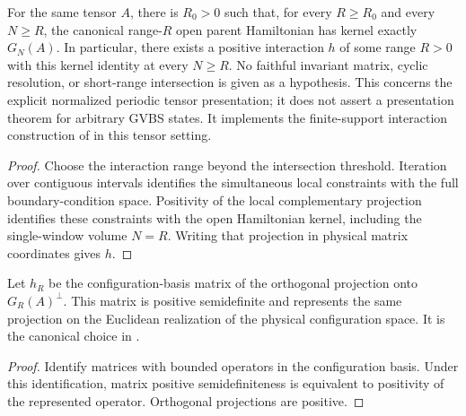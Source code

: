 \begin{lemma}
    \label{thm:periodic_original_parent_interaction}
    \leanok
    For the same tensor $A$, there is $R_0>0$ such that, for every $R\ge R_0$
    and every $N\ge R$, the canonical range-$R$ open parent Hamiltonian has
    kernel exactly $G_N(A)$. In particular, there exists a positive interaction
    $h$ of some range $R>0$ with this kernel identity at every $N\ge R$.
    No faithful invariant matrix, cyclic resolution, or short-range intersection
    is given as a hypothesis.
    This concerns the explicit normalized periodic tensor presentation; it does
    not assert a presentation theorem for arbitrary GVBS states.
    It implements the finite-support interaction construction of
    \cite[Lemma existenceinteraction and Theorem~1.1]{Nachtergaele1996Spectral}
    in this tensor setting.
\end{lemma}
\begin{proof}\leanok
    Choose the interaction range beyond the intersection threshold.
    Iteration over contiguous intervals identifies the simultaneous local
    constraints with the full boundary-condition space. Positivity of the
    local complementary projection identifies these constraints with the open
    Hamiltonian kernel, including the single-window volume $N=R$.
    Writing that projection in physical matrix coordinates gives $h$.
\end{proof}

\begin{definition}
    \label{def:canonical_parent_interaction_matrix}
    \leanok
    Let \(h_R\) be the configuration-basis matrix of the orthogonal
    projection onto \(G_R(A)^\perp\). This matrix is positive semidefinite
    and represents the same projection on the Euclidean realization of
    the physical configuration space. It is the canonical choice in
    \cite[Lemma existenceinteraction]{Nachtergaele1996Spectral}.
\end{definition}
\begin{proof}\leanok
    Identify matrices with bounded operators in the configuration basis.
    Under this identification, matrix positive semidefiniteness is equivalent
    to positivity of the represented operator. Orthogonal projections are
    positive.
\end{proof}

